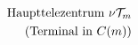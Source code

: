 \documentclass[preview]{standalone}
\begin{document}
\begin{align*}
\special{dvisvgm:raw <g id='unique000'>}\text{Haupttelezentrum }\nu\mathcal{T}_m\\\text{(Terminal in }C(m))\special{dvisvgm:raw </g>}
\end{align*}
\end{document}
